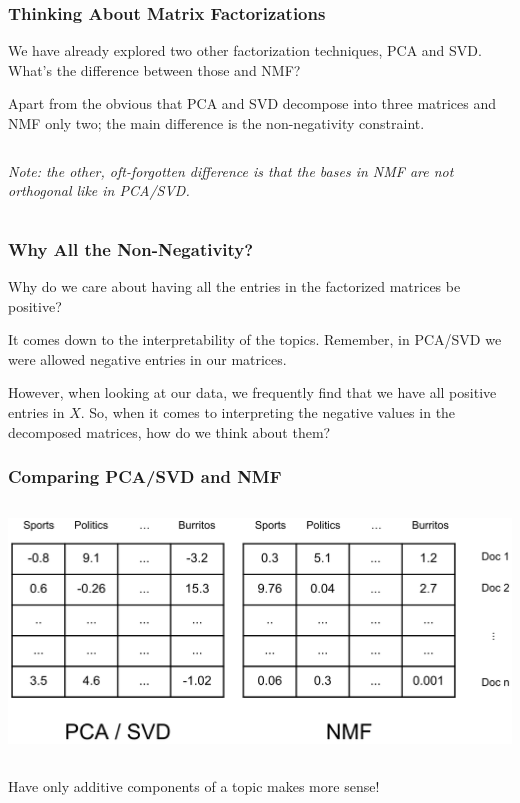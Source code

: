 \documentclass{beamer}
\begin{document}
\begin{frame}
  \frametitle{Thinking About Matrix Factorizations}
  We have already explored two other factorization techniques, PCA and SVD. What's the difference between those and NMF? \vspace{4mm} \pause

  Apart from the obvious that PCA and SVD decompose into three matrices and NMF only two; the main difference is the non-negativity constraint. \vspace{6mm}

  \begin{columns}
    \textit{Note: the other, oft-forgotten difference is that the bases in NMF are not orthogonal like in PCA/SVD.}
  \end{columns}
\end{frame}

\begin{frame}
  \frametitle{Why All the Non-Negativity?}
  Why do we care about having all the entries in the factorized matrices be positive? \vspace{5mm} \pause

  It comes down to the interpretability of the topics. Remember, in PCA/SVD we were allowed negative entries in our matrices. \vspace{5mm} \pause

  However, when looking at our data, we frequently find that we have all positive entries in $X$. So, when it comes to interpreting the negative values in the decomposed matrices, how do we think about them?
\end{frame}

\begin{frame}
  \frametitle{Comparing PCA/SVD and NMF}
  \begin{columns}
    \includegraphics[width=\textwidth]{images/pca_nmf.png}
  \end{columns} \vspace{4mm}

  Have only additive components of a topic makes more sense!
\end{frame}
\end{document}

